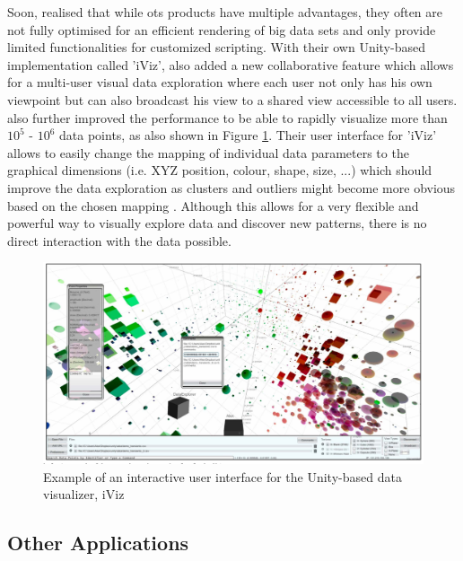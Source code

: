 Soon, \cite{Donalek2014} realised that while \gls{ots} products have multiple advantages, they often are not fully optimised for an efficient rendering of big data sets and only provide limited functionalities for customized scripting. With their own Unity-based implementation called 'iViz', \cite{Donalek2014} also added a new collaborative feature which allows for a multi-user visual data exploration where each user not only has his own viewpoint but can also broadcast his view to a shared view accessible to all users. \cite{Donalek2014} also further improved the performance to be able to rapidly visualize more than $10^{5}$ - $10^{6}$ data points, as also shown in Figure \ref{fig:iviz}. Their user interface for 'iViz' allows to easily change the mapping of individual data parameters to the graphical dimensions (i.e. XYZ position, colour, shape, size, ...) which should improve the data exploration as clusters and outliers might become more obvious based on the chosen mapping \citep{Donalek2014}. Although this allows for a very flexible and powerful way to visually explore data and discover new patterns, there is no direct interaction with the data possible.
\begin{figure}[h]
	\begin{center}
		\includegraphics[width=14cm]{03_Figures/05_LitReview/Donalek2014_iViz.png}
		\caption[Example of an interactive user interface for the Unity-based data visualizer, iViz]{Example of an interactive user interface for the Unity-based data visualizer, iViz \citep{Donalek2014}}
		\label{fig:iviz}
	\end{center}
\end{figure}


\subsection{Other Applications}

